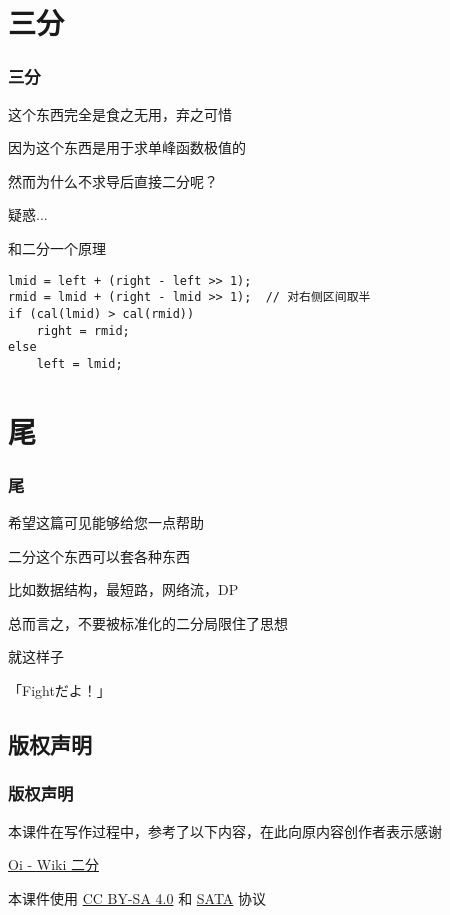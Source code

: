 \documentclass[10pt]{beamer}
\begin{document}
	\section{三分}
	\begin{frame}[fragile]
		\frametitle{三分}
		
		这个东西完全是食之无用，弃之可惜

		\pause

		因为这个东西是用于求单峰函数极值的

		\pause

		然而为什么不求导后直接二分呢？

		疑惑...

		和二分一个原理 

		\pause

		\begin{lstlisting}[title=参考代码, frame=shadowbox]
lmid = left + (right - left >> 1);
rmid = lmid + (right - lmid >> 1);  // 对右侧区间取半
if (cal(lmid) > cal(rmid))
    right = rmid;
else
    left = lmid;
\end{lstlisting}

	\end{frame}

	\section{尾}
	\begin{frame}
		\frametitle{尾}
		希望这篇可见能够给您一点帮助

		二分这个东西可以套各种东西

		比如数据结构，最短路，网络流，DP

		总而言之，不要被标准化的二分局限住了思想

		就这样子

		「Fightだよ！」
	\end{frame}

	\subsection{版权声明}

	\begin{frame}
		\frametitle{版权声明}
		本课件在写作过程中，参考了以下内容，在此向原内容创作者表示感谢

		\href{https://oi-wiki.org/basic/binary/}{ Oi - Wiki 二分 }

		\pause
		本课件使用 \href{https://creativecommons.org/licenses/by-sa/4.0/deed.zh}{CC BY-SA 4.0} 和 \href{https://github.com/zTrix/sata-license}{SATA} 协议
	\end{frame}
\end{document}
